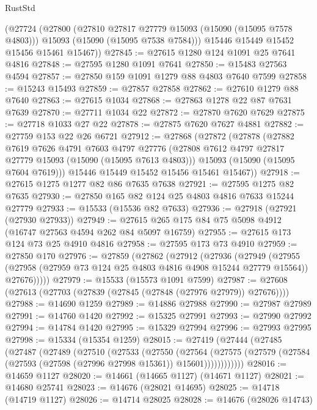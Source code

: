 \begin{lexlean}{RustStd}
\begin{coremodule}
      (@27724
        (@27800
          (@27810 @27817 @27779 @15093 (@15090 (@15095 @7578 @4803)))
          @15093
          (@15090 (@15095 @7538 @7584)))
        @15446
        @15449
        @15452
        @15456
        @15461
        @15467))
@27845 := @27615 @1280 @124 @1091 @25 @7641 @4816
@27848 := @27595 @1280 @1091 @7641
@27850 := @15483 @27563 @4594
@27857 := @27850 @159 @1091 @1279 @88 @4803 @7640 @7599
@27858 := @15243 @15493
@27859 := @27857 @27858
@27862 := @27610 @1279 @88 @7640
@27863 := @27615 @1034
@27868 := @27863 @1278 @22 @87 @7631 @7639
@27870 := @27711 @1034 @22
@27872 := @27870 @7620 @7629
@27875 := @27718 @1033 @27 @22
@27878 := @27875 @7620 @7627 @4881
@27882 := @27759 @153 @22 @26 @6721
@27912 := @27868
    (@27872
      (@27878
        (@27882
          @7619
          @7626
          @4791
          @7603
          @4797
          @27776
          (@27808 @7612 @4797 @27817 @27779 @15093 (@15090 (@15095 @7613 @4803)))
          @15093
          (@15090 (@15095 @7604 @7619)))
        @15446
        @15449
        @15452
        @15456
        @15461
        @15467))
@27918 := @27615 @1275 @1277 @82 @86 @7635 @7638
@27921 := @27595 @1275 @82 @7635
@27930 := @27850 @165 @82 @124 @25 @4803 @4816 @7633 @15244 @27779
@27933 := @15533 (@15536 @82 @7633)
@27936 := @27918 (@27921 (@27930 @27933))
@27949 := @27615 @265 @175 @84 @75 @5098 @4912 (@16747 @27563 @4594 @262 @84 @5097 @16759)
@27955 := @27615 @173 @124 @73 @25 @4910 @4816
@27958 := @27595 @173 @73 @4910
@27959 := @27850 @170
@27976 := @27859
    (@27862
      (@27912
        (@27936
          (@27949
            (@27955
              (@27958 (@27959 @73 @124 @25 @4803 @4816 @4908 @15244 @27779 @15564))
              @27676)))))
@27979 := @15533 (@15573 @1091 @7599)
@27987 := @27608 (@27613 (@27703 (@27839 (@27845 (@27848 (@27976 @27979)) @27676))))
@27988 := @14690 @1259
@27989 := @14886 @27988
@27990 := @27987 @27989
@27991 := @14760 @1420
@27992 := @15325 @27991
@27993 := @27990 @27992
@27994 := @14784 @1420
@27995 := @15329 @27994
@27996 := @27993 @27995
@27998 := @15334 (@15354 @1259)
@28015 := @27419
    (@27444
      (@27485
        (@27487
          (@27489
            (@27510
              (@27533
                (@27550
                  (@27564
                    (@27575
                      (@27579 (@27584 (@27593 (@27598 (@27996 @27998 @15361)) @15601))))))))))))
@28016 := @14659 @1127
@28020 := @14661 (@14665 @1127) (@14671 @1127)
@28021 := @14680 @25741
@28023 := @14676 (@28021 @14695)
@28025 := @14718 (@14719 @1127)
@28026 := @14714 @28025
@28028 := @14676 (@28026 @14743)

\end{coremodule}
\end{lexlean}
